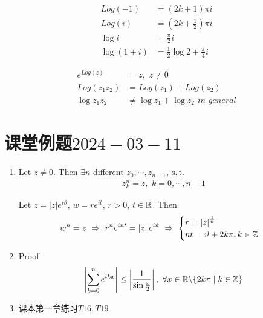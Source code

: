 \vspace{2em}
\begin{example}\label{ex 3.1.2}
	\begin{align}
		Log(-1) &= (2k + 1)\pi i \\
		Log(i) &= (2k + \frac{1}{2})\pi i \\
		\log{i} &= \frac{\pi}{2}i \\
		\log{(1 + i)} &= \frac{1}{2}\log{2} + \frac{\pi}{4}i
	\end{align}
\end{example}

\vspace{2em}
\begin{proposition}
	\begin{align}
		e^{Log(z)} &= z , \,\, z \neq 0 \\
		Log(z_1 z_2) &= Log(z_1) + Log(z_2) \\
		\log{z_1 z_2} &\neq \log{z_1} + \log{z_2} \,\, in \,\, general
	\end{align}
\end{proposition}

\newpage
\section{课堂例题$2024-03-11$}
\begin{enumerate}
	\item Let $z \neq 0$. Then $\exists n$ different $z_0 , \cdots , z_{n - 1}$, $\operatorname{s.t.}$
	\begin{align}
		z_{k}^{n} = z , \,\, k = 0 , \cdots , n - 1
	\end{align}
	
	\vspace{2em}
	\begin{solution}
		Let $z = \left| z \right| e^{i\vartheta}$, $w = r e^{it}$, $r > 0$, $t \in \mathbb{R}$. Then
		\begin{align}
			w^n = z \,\, \Rightarrow \,\, r^n e^{int} = \left| z \right| e^{i\vartheta} \,\, \Rightarrow \,\, 
			\begin{cases}
				r = \left| z \right|^{\frac{1}{n}} \\
				nt = \vartheta + 2k\pi , k \in \mathbb{Z}
			\end{cases}
		\end{align}
	\end{solution}
	
	\vspace{2em}
	
	\item Proof
	\begin{align}
		\left| \sum_{k = 0}^{n}{e^{ikx}}  \right| \leq \left| \frac{1}{\sin{\frac{x}{2}}} \right| , \,\, \forall x \in \mathbb{R} \backslash \{ 2k\pi \mid k \in \mathbb{Z} \}
	\end{align}
	
	\vspace{2em}
	
	\item 课本第一章练习$T16 , T19$
\end{enumerate}

